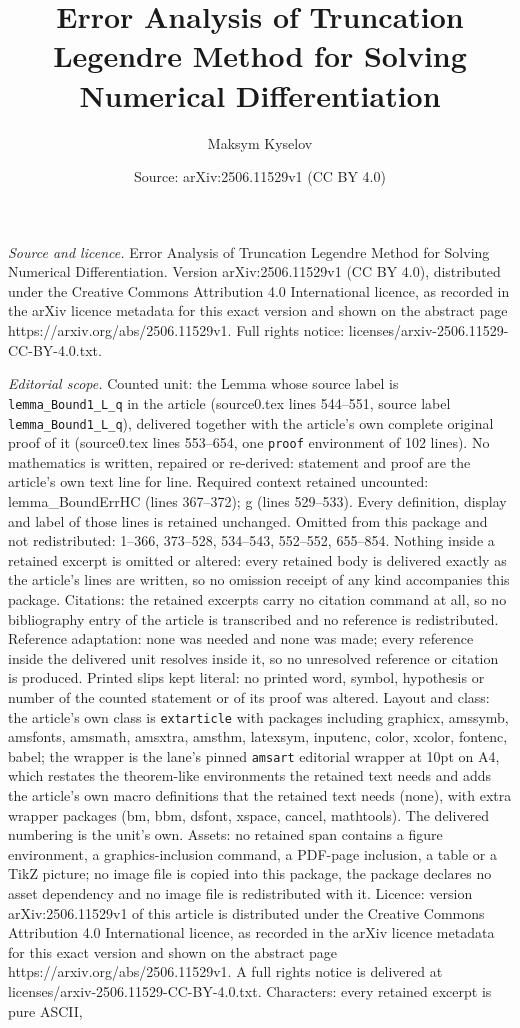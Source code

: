 \documentclass[10pt,a4paper]{amsart}
\title[Error Analysis of Truncation Legendre Method for Solving Num]{Error Analysis of Truncation Legendre Method for Solving Numerical Differentiation}
\author{Maksym Kyselov}
\date{Source: arXiv:2506.11529v1 (CC BY 4.0)}
\begin{document}
\maketitle

\noindent\emph{Source and licence.} Error Analysis of Truncation Legendre Method for Solving Numerical Differentiation. Version arXiv:2506.11529v1 (CC BY 4.0), distributed under the Creative Commons Attribution 4.0 International licence, as recorded in the arXiv licence metadata for this exact version and shown on the abstract page https://arxiv.org/abs/2506.11529v1. Full rights notice: licenses/arxiv-2506.11529-CC-BY-4.0.txt.\par\smallskip

\noindent\textit{Editorial scope.} Counted unit: the Lemma whose source label is \texttt{lemma\_Bound1\_L\_q} in the article (source0.tex lines 544--551, source label \texttt{lemma\_Bound1\_L\_q}), delivered together with the article's own complete original proof of it (source0.tex lines 553--654, one \texttt{proof} environment of 102 lines). No mathematics is written, repaired or re-derived: statement and proof are the article's own text line for line. Required context retained uncounted: lemma\_BoundErrHC (lines 367--372); g (lines 529--533). Every definition, display and label of those lines is retained unchanged. Omitted from this package and not redistributed: 1--366, 373--528, 534--543, 552--552, 655--854. Nothing inside a retained excerpt is omitted or altered: every retained body is delivered exactly as the article's lines are written, so no omission receipt of any kind accompanies this package. Citations: the retained excerpts carry no citation command at all, so no bibliography entry of the article is transcribed and no reference is redistributed. Reference adaptation: none was needed and none was made; every reference inside the delivered unit resolves inside it, so no unresolved reference or citation is produced. Printed slips kept literal: no printed word, symbol, hypothesis or number of the counted statement or of its proof was altered. Layout and class: the article's own class is \texttt{extarticle} with packages including graphicx, amssymb, amsfonts, amsmath, amsxtra, amsthm, latexsym, inputenc, color, xcolor, fontenc, babel; the wrapper is the lane's pinned \texttt{amsart} editorial wrapper at 10pt on A4, which restates the theorem-like environments the retained text needs and adds the article's own macro definitions that the retained text needs (none), with extra wrapper packages (bm, bbm, dsfont, xspace, cancel, mathtools). The delivered numbering is the unit's own. Assets: no retained span contains a figure environment, a graphics-inclusion command, a PDF-page inclusion, a table or a TikZ picture; no image file is copied into this package, the package declares no asset dependency and no image file is redistributed with it. Licence: version arXiv:2506.11529v1 of this article is distributed under the Creative Commons Attribution 4.0 International licence, as recorded in the arXiv licence metadata for this exact version and shown on the abstract page https://arxiv.org/abs/2506.11529v1. A full rights notice is delivered at licenses/arxiv-2506.11529-CC-BY-4.0.txt. Characters: every retained excerpt is pure ASCII, 
\end{document}
